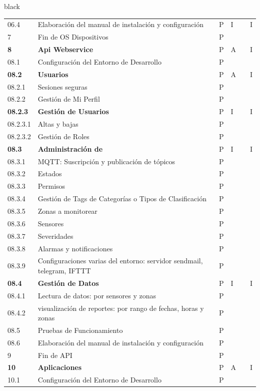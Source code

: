 \documentclass[11pt]{charter}
\begin{document}
\begin{landscape}
\begin{consigna}{black}
\begin{tabularx}{\linewidth}{@{}|p{1.3cm}|p{9.3cm}|p{3cm}|p{3cm}|p{3cm}|p{3cm}|@{}}
06.4 & Elaboración del manual de instalación y   configuración & P & I &  & I \\
7 & Fin de OS Dispositivos & P &  &  &  \\
\textbf{8} & \textbf{Api Webservice} & P & A &  & I \\
08.1 & Configuración del Entorno de Desarrollo & P &  &  &  \\
\textbf{08.2} & \textbf{Usuarios} & P & A &  & I \\
08.2.1 & Sesiones seguras & P &  &  &  \\
08.2.2 & Gestión de Mi Perfil & P &  &  &  \\
\textbf{08.2.3} & \textbf{Gestión de Usuarios} & P & I &  & I \\
08.2.3.1 & Altas y bajas & P &  &  &  \\
08.2.3.2 & Gestión de Roles & P &  &  &  \\
\textbf{08.3} & \textbf{Administración de} & P & I &  & I \\
08.3.1 & MQTT: Suscripción y   publicación de tópicos & P &  &  &  \\
08.3.2 & Estados & P &  &  &  \\
08.3.3 & Permisos & P &  &  &  \\
08.3.4 & Gestión de Tags de Categorías   o Tipos de Clasificación & P &  &  &  \\
08.3.5 & Zonas a monitorear & P &  &  &  \\
08.3.6 & Sensores & P &  &  &  \\
08.3.7 & Severidades & P &  &  &  \\
08.3.8 & Alarmas y notificaciones & P &  &  &  \\
08.3.9 & Configuraciones varias del   entorno: servidor sendmail, telegram, IFTTT & P &  &  &  \\
\textbf{08.4} & \textbf{Gestión de Datos} & P & I &  & I \\
08.4.1 & Lectura de datos: por   sensores y zonas & P &  &  &  \\
08.4.2 & visualización de reportes:   por rango de fechas, horas y zonas & P &  &  &  \\
08.5 & Pruebas de Funcionamiento & P &  &  &  \\
08.6 & Elaboración del manual de instalación y   configuración & P &  &  &  \\
9 & Fin de API & P &  &  &  \\
\textbf{10} & \textbf{Aplicaciones} & P & A &  & I \\
10.1 & Configuración del Entorno de Desarrollo & P &  &  &  \\

\end{tabularx}
\end{consigna}
\end{landscape}
\end{document}
